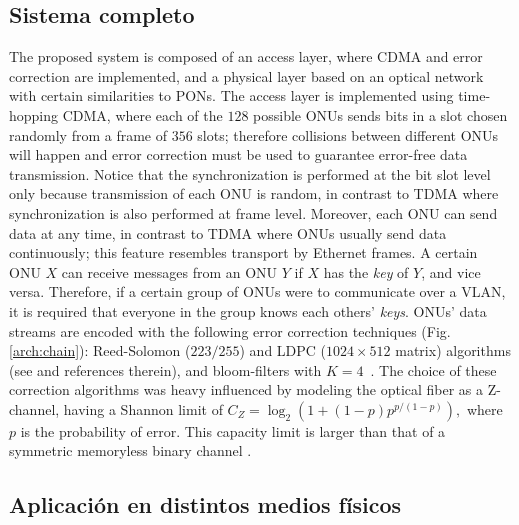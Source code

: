 \documentclass[12pt,twoside,openright]{moddalthesis}
\begin{document}
\subsection{Sistema completo}
The proposed system is composed of an access layer, where CDMA and error correction are implemented, and a physical layer based on an optical network with certain similarities to PONs. 
The access layer is implemented using time-hopping CDMA, where each of the $128$ possible ONUs sends bits in a slot chosen randomly from a frame of $356$ slots; therefore
collisions between different ONUs will happen and error correction must be used to guarantee error-free data transmission. 
Notice that the synchronization is performed at the bit slot level only because transmission of each ONU is random, in contrast to TDMA where synchronization is also performed at frame level. 
Moreover, each ONU can send data at any time, in contrast to TDMA where
ONUs usually send data continuously; this feature resembles transport by Ethernet frames.
A certain ONU $X$ can receive messages from an ONU $Y$ if $X$ has the
{\em key} of $Y$, and vice versa. Therefore, if a certain group of ONUs
were to communicate over a VLAN, it is required that everyone in the group
knows each others' {\em keys}.
ONUs' data streams are encoded with the following error correction techniques (Fig. \ref{arch:chain}):
 Reed-Solomon ($223/255$) and LDPC ($1024\times512$ matrix) algorithms (see \cite{Moon:05} and references therein), and bloom-filters with $K=4$~\cite{Bloom70space/timetrade-offs}.
The choice of these correction algorithms was heavy influenced by
modeling the optical fiber as a Z-channel, having a Shannon limit of $ C_{Z} = \log_2\left(1+(1-p) p^{p/(1-p)}\right),$ where $p$ is the probability of error. 
This capacity limit is larger than that of a symmetric memoryless binary channel \cite{Tallini:02}.

\subsection{Aplicación en distintos medios físicos}
\end{document}
